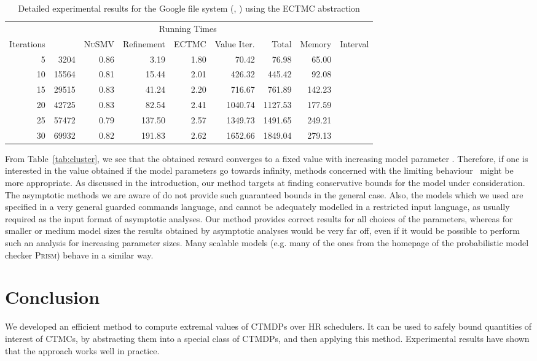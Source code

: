 \documentclass[10pt,twocolumn]{article}
\newcommand{\PRISM}{\textsc{Prism}\xspace}
\newcommand{\NUSMV}{\textsc{NuSMV}\xspace}
\begin{document}
\begin{table*}[tb]
  \centering
  \caption{Detailed experimental results for the Google file system (, ) using the ECTMC abstraction}
  \label{tab:google_detailed_cmc}
\begin{tabular}{|rr|rrrrr|r|c|}
  \hline
               &                & \multicolumn{5}{c|}{Running Times} & &  \\
  Iterations &  & \NUSMV & Refinement & ECTMC & Value Iter. & Total & Memory & Interval \\
  \hline
  5 & 3204 & 0.86 & 3.19 & 1.80 & 70.42 & 76.98 & 65.00 &  \\
  10 & 15564 & 0.81 & 15.44 & 2.01 & 426.32 & 445.42 & 92.08 &  \\
  15 & 29515 & 0.83 & 41.24 & 2.20 & 716.67 & 761.89 & 142.23 &  \\
  20 & 42725 & 0.83 & 82.54 & 2.41 & 1040.74 & 1127.53 & 177.59 &  \\
  25 & 57472 & 0.79 & 137.50 & 2.57 & 1349.73 & 1491.65 & 249.21 &  \\
  30 & 69932 & 0.82 & 191.83 & 2.62 & 1652.66 & 1849.04 & 279.13 &  \\
  \hline
\end{tabular}
\end{table*}

From Table~\ref{tab:cluster}, we see that the obtained reward converges to a fixed value with increasing model parameter .
Therefore, if one is interested in the value obtained if the model parameters go towards infinity, methods concerned with the limiting behaviour~\cite{BortolussiH12,BortolussiH13,HenzingerMMW10,AngiusHW13} might be more appropriate.
As discussed in the introduction, our method targets at finding conservative bounds for the model under consideration.
The asymptotic methods we are aware of do not provide such guaranteed bounds in the general case.
Also, the models which we used are specified in a very general guarded commands language, and cannot be adequately modelled in a restricted input language, as usually required as the input format of asymptotic analyses.
Our method provides correct results for all choices of the parameters, whereas for smaller or medium model sizes the results obtained by asymptotic analyses would be very far off, even if it would be possible to perform such an analysis for increasing parameter sizes.
Many scalable models (e.g. many of the ones from the homepage of the probabilistic model checker \PRISM) behave in a similar way.

\section{Conclusion}
\label{sec:conclusion}
\noindent We developed an efficient method to compute extremal values of CTMDPs over HR schedulers.
It can be used to safely bound quantities of interest of CTMCs, by abstracting them into a special class of CTMDPs, and then applying this method.
Experimental results have shown that the approach works well in practice.
\end{document}

